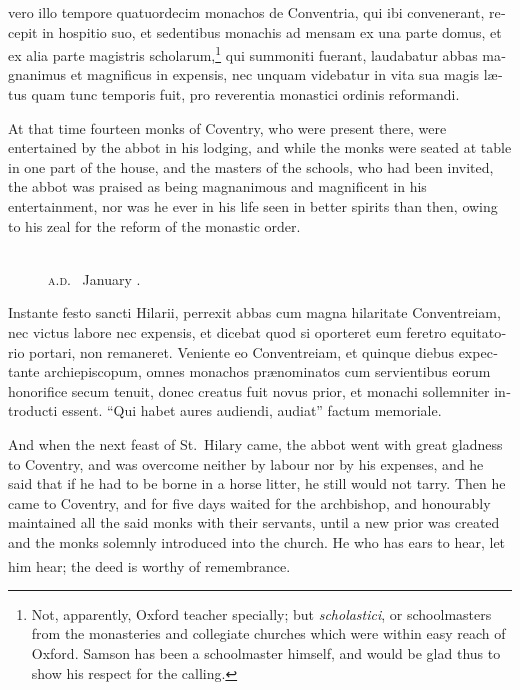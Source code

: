 \documentclass{book}
\newcounter{engnote}
\newcommand{\engnotenum}{\textsuperscript{\arabic{engnote}\stepcounter{engnote}}}
\newcommand{\engnotetext}[1]{\vphantom{\footnotemark{}}\footnotetext{#1}}
\newcommand{\blockhead}[4][]{
\begin{figure}
\centering
\vspace{#4}
\parbox{2.75cm}{\begin{center}\footnotesize \color{BrickRed} \emph{#2}\\ #1 \end{center}}
\end{figure}
}
\begin{document}
\begin{paracol}{2}
\switchcolumn*

\begin{otherlanguage}{latin}
vero illo tempore quatuordecim monachos de Conventria, qui ibi convenerant, recepit in hospitio suo, et sedentibus monachis ad mensam ex una parte domus, et ex alia parte magistris scholarum,\footnote[\textdagger]{Not, apparently, Oxford teacher specially; but \emph{scholastici}, or schoolmasters from the monasteries and collegiate churches which were within easy reach of Oxford. Samson has been a schoolmaster himself, and would be glad thus to show his respect for the calling.} qui summoniti fuerant, laudabatur abbas magnanimus et magnificus in expensis, nec unquam videbatur in vita sua magis l\ae{}tus quam tunc temporis fuit, pro reverentia monastici ordinis reformandi. 
\end{otherlanguage}

\switchcolumn

At that time fourteen monks of Coventry, who were present there, were entertained by the abbot in his lodging, and while the monks were seated at table in one part of the house, and the masters of the schools, who had been invited, the abbot was praised as being magnanimous and magnificent in his entertainment, nor was he ever in his life seen in better spirits than then, owing to his zeal for the reform of the monastic order.

\switchcolumn*

\begin{otherlanguage}{latin}
\blockhead[\textsc{a.d}.\  January \oldstylenums{13}.]{}{2}{-.7cm} 
Instante festo sancti Hilarii, perrexit abbas cum magna hilaritate Conventreiam, nec victus labore nec expensis, et dicebat quod si oporteret eum feretro equitatorio portari, non remaneret. Veniente eo Conventreiam, et quinque diebus expectante archiepiscopum, omnes monachos pr\ae{}nominatos cum servientibus eorum honorifice secum tenuit, donec creatus fuit novus prior, et monachi sollemniter introducti essent. ``Qui habet aures audiendi, audiat''\engnotetext{Matt.\ xi., \oldstylenums{15}.} factum memoriale.

\end{otherlanguage}

\switchcolumn

And when the next feast of St.\ Hilary came, the abbot went with great gladness to Coventry, and was overcome neither by labour nor by his expenses, and he said that if he  had to be borne in a horse litter, he still would not tarry. Then he came to Coventry, and for five days waited for the archbishop, and honourably maintained all the said monks with their servants, until a new prior was created and the  monks solemnly introduced into the church. He who has ears to hear, let him hear;\engnotenum{} the deed is worthy of remembrance.


\end{paracol}
\end{document}
